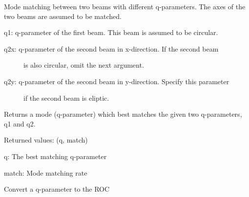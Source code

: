 \documentclass[letterpaper,10pt,english]{sphinxmanual}
\begin{document}
\begin{fulllineitems}
\label{api/gtrace.optics:gtrace.optics.gaussian.modeMatching}
Mode matching between two beams with different q-parameters.
The axes of the two beams are assumed to be matched.

q1: q-parameter of the first beam. This beam is assumed to be circular.
\begin{description}
\item[{q2x: q-parameter of the second beam in x-direction. If the second beam}] \leavevmode
is also circular, omit the next argument.

\item[{q2y: q-parameter of the second beam in y-direction. Specify this parameter}] \leavevmode
if the second beam is eliptic.

\end{description}

\end{fulllineitems}


\begin{fulllineitems}
\label{api/gtrace.optics:gtrace.optics.gaussian.modeSpacing}
\end{fulllineitems}


\begin{fulllineitems}
\label{api/gtrace.optics:gtrace.optics.gaussian.optimalMatching}
Returns a mode (q-parameter) which best matches the given
two q-parameters, q1 and q2.

Returned values: (q, match)

q: The best matching q-parameter

match: Mode matching rate

\end{fulllineitems}


\begin{fulllineitems}
\label{api/gtrace.optics:gtrace.optics.gaussian.q2R}
Convert a q-parameter to the ROC

\end{fulllineitems}
\end{document}
